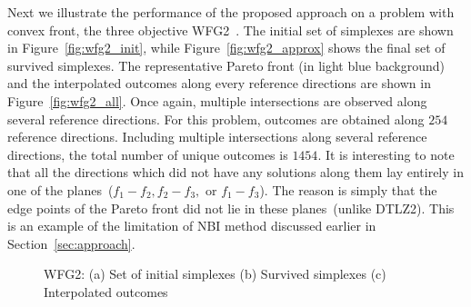 Next we illustrate the performance of the proposed approach on a problem with convex front, the three objective WFG2~\cite{huband_2006}. The initial set of {\color{blue}simplexes} are shown in Figure~\ref{fig:wfg2_init}, while Figure~\ref{fig:wfg2_approx} shows the final set of survived simplexes. The representative Pareto front (in light blue background) and the interpolated outcomes along every reference directions are shown in Figure~\ref{fig:wfg2_all}. Once again, multiple intersections are observed along several reference directions. For this problem, outcomes are obtained along $254$ reference directions. Including multiple intersections along several reference directions, the total number of unique outcomes is $1454$. {\color{blue}It is interesting to note that all the directions which did not have any solutions along them lay entirely in one of the planes~($f_1-f_2,f_2-f_3,$ or $f_1-f_3$). The reason is simply that the edge points of the Pareto front did not lie in these planes~(unlike DTLZ2). This is an example of the limitation of NBI method discussed earlier in Section~\ref{sec:approach}.} 

\begin{figure*}[!ht]
	\centering
	\caption{WFG2: (a) Set of initial {\color{blue}simplexes} (b) Survived {\color{blue}simplexes} (c) Interpolated outcomes}
	\label{fig:wfg2_true_approx}
\end{figure*}


